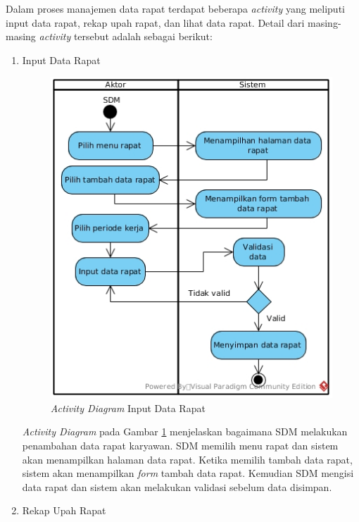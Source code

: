 \begin{enumerate}
            	Dalam proses manajemen data rapat terdapat beberapa \emph{activity} yang meliputi input data rapat, rekap upah rapat, dan lihat data rapat. Detail dari masing-masing \emph{activity} tersebut adalah sebagai berikut:
            	\begin{enumerate}[label=\alph*.]
            	    \itemsep0em
            	    \item Input Data Rapat
            	    \begin{figure}[H]
            		    \centering            		    \includegraphics[width=11cm]{gambar/activity/input-data-rapat}
            		    \caption{\emph{Activity Diagram} Input Data Rapat}
            		    \label{activity_input_rapat}
            		\end{figure}
            		\emph{Activity Diagram} pada Gambar \ref{activity_input_rapat} menjelaskan bagaimana SDM melakukan penambahan data rapat karyawan. SDM memilih menu rapat dan sistem akan menampilkan halaman data rapat. Ketika memilih tambah data rapat, sistem akan menampilkan \emph{form} tambah data rapat. Kemudian SDM mengisi data rapat dan sistem akan melakukan validasi sebelum data disimpan.
            		\item Rekap Upah Rapat
            		\begin{figure}[H]

\end{figure}
\end{enumerate}
\end{enumerate}
